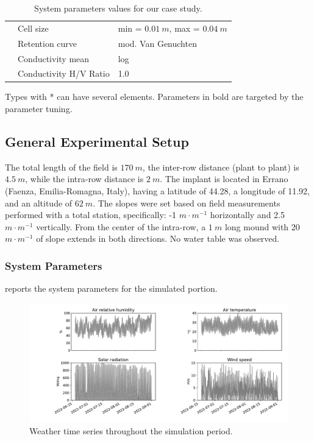 \begin{table}[H]
\begin{tabular}{p{1.2cm}p{5cm}p{7.5cm}}
		& Cell size  &  min = $0.01~m$, max = $0.04~m$  \\
		& Retention curve & mod. Van Genuchten\\ 
	    & Conductivity mean &  log \\
		& Conductivity H/V Ratio  &  1.0 \\
		\bottomrule
	\end{tabular}%
	\begin{tablenotes}
      \scriptsize
      \item Types with * can have several elements. Parameters in bold are targeted by the parameter tuning.
    \end{tablenotes}
        \caption{System parameters values for our case study.}

	\label{tab:parameter_instances}%
\end{table}%

\subsection{General Experimental Setup}
\label{orchard-ssec:settings}

The total length of the field is $170~m$, the inter-row distance (plant to plant) is $4.5~m$, while the intra-row distance is $2~m$.
The implant is located in Errano (Faenza, Emilia-Romagna, Italy), having a latitude of 44.28, a longitude of 11.92, and an altitude of $62~m$.
The slopes were set based on field measurements performed with a total station, specifically: -1 $m \cdot m^{-1}$ horizontally and 2.5 $m \cdot m^{-1}$ vertically.
From the center of the intra-row, a $1~m$ long mound with 20 $m \cdot m^{-1}$ of slope extends in both directions.
No water table was observed.

\subsubsection{System Parameters}

 reports the system parameters for the simulated portion.

\begin{figure}[t]
    \centering
    \includegraphics[scale=.45]{chapters/physics-aware/orchard/img/meteo.pdf}
    \caption{Weather time series throughout the simulation period.}
    \label{orchard-fig:meteo}
\end{figure}

